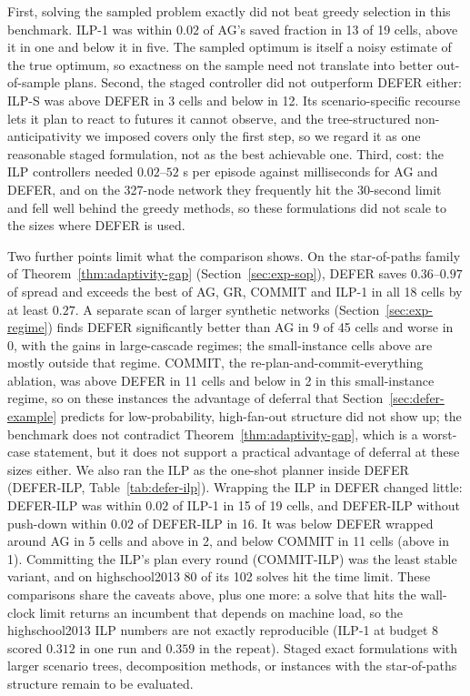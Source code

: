 \documentclass[11pt]{article}
\theoremstyle{definition}
\theoremstyle{remark}
\begin{document}
First, solving the sampled problem exactly did not beat greedy selection in
this benchmark. ILP-1 was within $0.02$ of AG's saved fraction in 13
of 19 cells, above it in one and below it in five. The sampled optimum is itself a noisy
estimate of the true optimum, so exactness on the sample need not translate
into better out-of-sample plans. Second, the staged controller did not
outperform DEFER either: ILP-S was above DEFER in 3 cells and
below in 12. Its scenario-specific recourse lets it plan to react to futures it
cannot observe, and the tree-structured non-anticipativity we imposed covers
only the first step, so we regard it as one reasonable staged formulation, not
as the best achievable one. Third, cost: the ILP controllers needed
$0.02$--$52$ s per episode against milliseconds for AG and DEFER, and on the
327-node network they frequently hit the 30-second limit and fell well behind
the greedy methods, so these formulations did not scale to the sizes where
DEFER is used.

Two further points limit what the comparison shows. On the star-of-paths family
of Theorem~\ref{thm:adaptivity-gap} (Section~\ref{sec:exp-sop}), DEFER
saves $0.36$--$0.97$ of spread and exceeds the best of AG, GR, COMMIT and
ILP-1 in all 18 cells by at least $0.27$. A separate scan of larger
synthetic networks (Section~\ref{sec:exp-regime}) finds DEFER significantly
better than AG in 9 of 45 cells and worse in 0, with the gains in large-cascade regimes; the
small-instance cells above are mostly outside that regime. COMMIT, the
re-plan-and-commit-everything ablation, was above DEFER in 11 cells and below
in 2 in this small-instance regime, so on these instances the advantage of
deferral that Section~\ref{sec:defer-example} predicts for low-probability,
high-fan-out structure did not show up; the benchmark does not contradict
Theorem~\ref{thm:adaptivity-gap}, which is a worst-case statement, but it
does not support a practical advantage of deferral at these sizes either. We
also ran the ILP as the one-shot planner inside DEFER
(DEFER-ILP, Table~\ref{tab:defer-ilp}). Wrapping the
ILP in DEFER changed little: DEFER-ILP was within $0.02$ of
ILP-1 in 15 of 19 cells, and DEFER-ILP without push-down
within $0.02$ of DEFER-ILP in 16. It was below DEFER wrapped around AG in 5
cells and above in 2, and below COMMIT in 11 cells (above in 1). Committing the
ILP's plan every round (COMMIT-ILP) was the least stable variant,
and on highschool2013 80 of its 102 solves hit the time limit. These
comparisons share the caveats above, plus one more: a solve that hits the
wall-clock limit returns an incumbent that depends on machine load, so the
highschool2013 ILP numbers are not exactly reproducible (ILP-1 at
budget $8$ scored $0.312$ in one run and $0.359$ in the repeat). Staged exact formulations with larger scenario trees, decomposition methods, or
instances with the star-of-paths structure remain to be evaluated.
\end{document}
